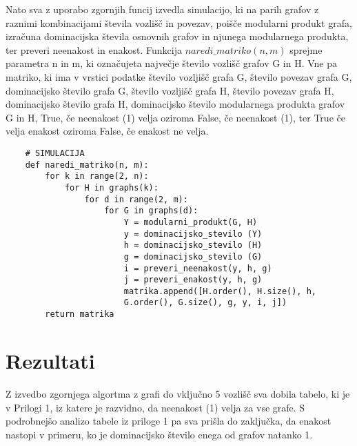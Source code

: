 \documentclass[a4paper,12pt]{article}
\begin{document}
Nato sva z uporabo zgornjih funcij izvedla simulacijo, ki na parih grafov z raznimi kombinacijami števila 
vozlišč in povezav, poišče modularni produkt grafa, izračuna dominacijska števila osnovnih grafov in njunega 
modularnega produkta, ter preveri neenakost in enakost. Funkcija $naredi\_matriko(n, m)$ sprejme parametra n in m, 
ki označujeta največje število vozlišč grafov G in H. Vne pa matriko, ki ima v vrstici podatke 
število vozljišč grafa G, število povezav grafa G, dominacijsko število grafa G, 
število vozljišč grafa H, število povezav grafa H, dominacijsko število grafa H, 
dominacijsko število modularnega produkta grafov G in H, True, če neenakost (1) velja oziroma False, če neenakost (1),
ter True če velja enakost oziroma False, če enakost ne velja. 
\begin{verbatim}
    # SIMULACIJA 
    def naredi_matriko(n, m):
        for k in range(2, n):
            for H in graphs(k):
                for d in range(2, m):
                    for G in graphs(d):
                        Y = modularni_produkt(G, H)
                        y = dominacijsko_stevilo (Y)
                        h = dominacijsko_stevilo (H)
                        g = dominacijsko_stevilo (G)
                        i = preveri_neenakost(y, h, g)
                        j = preveri_enakost(y, h, g)
                        matrika.append([H.order(), H.size(), h, 
                        G.order(), G.size(), g, y, i, j])
        return matrika
\end{verbatim}

\section{Rezultati}
Z izvedbo zgornjega algortma z grafi do vključno 5 vozlišč sva dobila tabelo, ki je v Prilogi 1, iz katere je razvidno, da neenakost (1) velja za vse grafe.
S podrobnejšo analizo tabele iz priloge 1 pa sva prišla do zaključka, da enakost nastopi v primeru, ko je dominacijsko število enega od grafov natanko 1.
\end{document}
